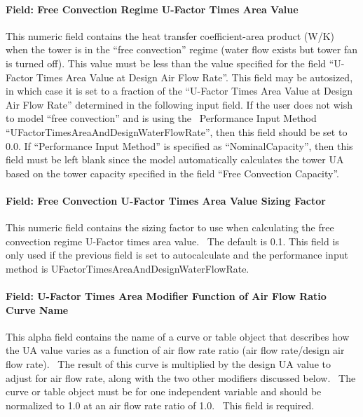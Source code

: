 \paragraph{Field: Free Convection Regime U-Factor Times Area Value}\label{field-free-convection-regime-u-factor-times-area-value}

This numeric field contains the heat transfer coefficient-area product (W/K) when the tower is in the ``free convection'' regime (water flow exists but tower fan is turned off). This value must be less than the value specified for the field ``U-Factor Times Area Value at Design Air Flow Rate''. This field may be autosized, in which case it is set to a fraction of the ``U-Factor Times Area Value at Design Air Flow Rate'' determined in the following input field. If the user does not wish to model ``free convection'' and is using the~ Performance Input Method ``UFactorTimesAreaAndDesignWaterFlowRate'', then this field should be set to 0.0. If ``Performance Input Method'' is specified as ``NominalCapacity'', then this field must be left blank since the model automatically calculates the tower UA based on the tower capacity specified in the field ``Free Convection Capacity''.

\paragraph{Field: Free Convection U-Factor Times Area Value Sizing Factor}\label{field-free-convection-u-factor-times-area-value-sizing-factor-2}

This numeric field contains the sizing factor to use when calculating the free convection regime U-Factor times area value.~ The default is 0.1. This field is only used if the previous field is set to autocalculate and the performance input method is UFactorTimesAreaAndDesignWaterFlowRate.

\paragraph{Field: U-Factor Times Area Modifier Function of Air Flow Ratio Curve Name}\label{field-u-factor-times-area-modifier-function-of-air-flow-ratio-curve-name}

This alpha field contains the name of a curve or table object that describes how the UA value varies as a function of air flow rate ratio (air flow rate/design air flow rate).~ The result of this curve is multiplied by the design UA value to adjust for air flow rate, along with the two other modifiers discussed below.~ The curve or table object must be for one independent variable and should be normalized to 1.0 at an air flow rate ratio of 1.0.~ This field is required.

